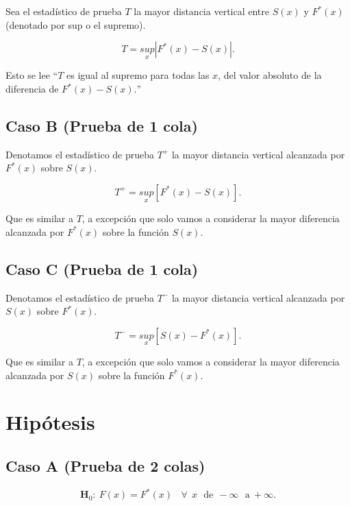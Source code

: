 \documentclass[
  a4paper,
  oneside,
  openany]{book}
\begin{document}
Sea el estadístico de prueba \(T\) la mayor distancia vertical entre \(S(x)\) y \(F^*(x)\)(denotado por sup o el supremo).

\[T=\underset{x}{sup}|F^*(x)-S(x)|.\]

Esto se lee ``\(T\) es igual al supremo para todas las \(x\), del valor absoluto de la diferencia de \(F^*(x)-S(x).\)''

\hypertarget{caso-b-prueba-de-1-cola}{%
\subsection*{Caso B (Prueba de 1 cola)}\label{caso-b-prueba-de-1-cola}}


Denotamos el estadístico de prueba \(T^+\) la mayor distancia vertical alcanzada por \(F^*(x)\) sobre \(S(x)\).

\[T^+=\underset{x}{sup}[F^*(x)-S(x)].\]

Que es similar a \(T\), a excepción que solo vamos a considerar la mayor diferencia alcanzada por \(F^*(x)\) sobre la función \(S(x)\).

\hypertarget{caso-c-prueba-de-1-cola}{%
\subsection*{Caso C (Prueba de 1 cola)}\label{caso-c-prueba-de-1-cola}}


Denotamos el estadístico de prueba \(T^-\) la mayor distancia vertical alcanzada por \(S(x)\) sobre \(F^*(x)\).

\[T^-=\underset{x}{sup}[S(x)-F^*(x)].\]

Que es similar a \(T\), a excepción que solo vamos a considerar la mayor diferencia alcanzada por \(S(x)\) sobre la función \(F^*(x)\).

\hypertarget{hipuxf3tesis-13}{%
\section{Hipótesis}\label{hipuxf3tesis-13}}

\hypertarget{caso-a-prueba-de-2-colas-1}{%
\subsection*{Caso A (Prueba de 2 colas)}\label{caso-a-prueba-de-2-colas-1}}


\[\textbf{H}_0:\ F(x)=F^*(x) \ \ \ \ \forall \ \ x \ \ \  \mbox{de}\  \ -\infty \ \ \ \mbox{a} \  +\infty. \]
\end{document}
